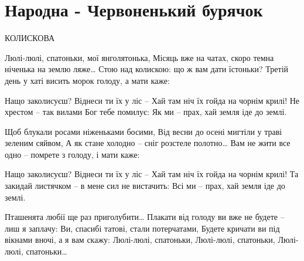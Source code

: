 \section{Народна - Червоненький бурячок}
\begin{guitar}
КОЛИСКОВА

Люлі-люлі, спатоньки, мої янголятонька,
Місяць вже на чатах, скоро темна ніченька на землю ляже…
Стою над колискою: що ж вам дати їстоньки?
Третій день у хаті висить морок голоду, а мати каже:

Нащо заколисуєш? Віднеси ти їх у ліс – 
Хай там ніч їх гойда на чорнім крилі!
Не хрестом – так вилами Бог тебе помилує:
Як ми – прах, хай земля іде до землі.

Щоб блукали росами ніженьками босими,
Від весни до осені мигтіли у траві зеленим сяйвом,
А як стане холодно – сніг розстеле полотно…
Вам не жити все одно – помрете з голоду, і мати каже:

Нащо заколисуєш? Віднеси ти їх у ліс – 
Хай там ніч їх гойда на чорнім крилі!
Та закидай листячком – в мене сил не вистачить:
Всі ми – прах, хай земля іде до землі.

Пташенята любії ще раз приголубити…
Плакати від голоду ви вже не будете – лиш я заплачу:
Ви, спасибі татові, стали потерчатами,
Будете кричати ви під вікнами вночі, а я вам скажу:
Люлі-люлі, спатоньки,
Люлі-люлі, спатоньки,
Люлі-люлі, спатоньки…
\end{guitar}
